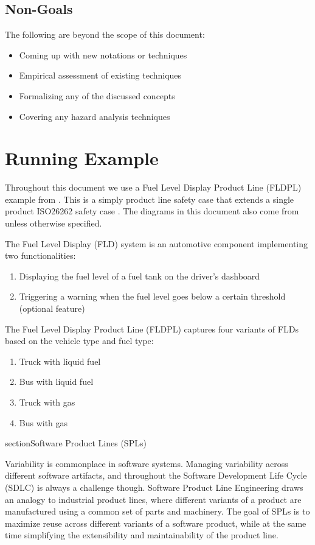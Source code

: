 \documentclass[11pt]{article}
\begin{document}
\subsection{Non-Goals} 

The following are beyond the scope of this document:

\begin{itemize}
\item Coming up with new notations or techniques
\item Empirical assessment of existing techniques
\item Formalizing any of the discussed concepts
\item Covering any hazard analysis techniques
\end{itemize}

\section{Running Example}

Throughout this document we use a Fuel Level Display Product Line (FLDPL) example from \cite{Gallucci_2013}. This is a simply product line safety case that extends a single product ISO26262 safety case \cite{Dardar_2014}. The diagrams in this document also come from \cite{Gallucci_2013} unless otherwise specified.

The Fuel Level Display (FLD) system is an automotive component implementing two functionalities:

\begin{enumerate}
\item Displaying the fuel level of a fuel tank on the driver's dashboard
\item Triggering a warning when the fuel level goes below a certain threshold (optional feature)
\end{enumerate}

The Fuel Level Display Product Line (FLDPL) captures four variants of FLDs based on the vehicle type and fuel type:

\begin{enumerate}
\item Truck with liquid fuel
\item Bus with liquid fuel
\item Truck with gas
\item Bus with gas
\end{enumerate}

section{Software Product Lines (SPLs)}

Variability is commonplace in software systems. Managing variability across different software artifacts, and throughout the Software Development Life Cycle (SDLC) is always a challenge though. Software Product Line Engineering draws an analogy to industrial product lines, where different variants of a product are manufactured using a common set of parts and machinery. The goal of SPLs is to maximize reuse across different variants of a software product, while at the same time simplifying the extensibility and maintainability of the product line.
\end{document}
